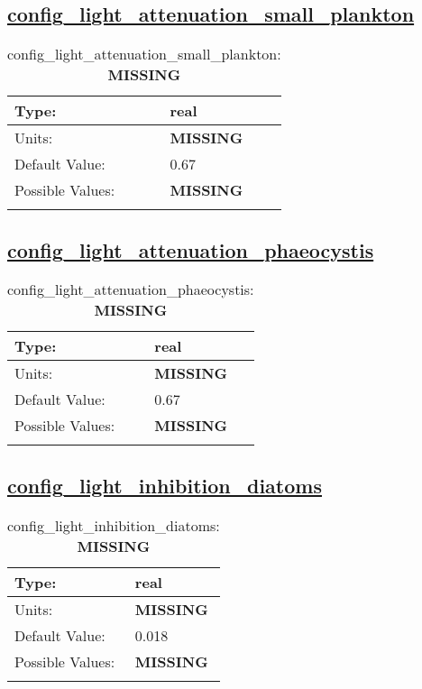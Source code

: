 \subsection[config\_light\_attenuation\_small\_plankton]{\hyperref[sec:nm_tab_biogeochemistry]{config\_light\_attenuation\_small\_plankton}}
\label{subsec:nm_sec_config_light_attenuation_small_plankton}
\begin{center}
\begin{longtable}{| p{2.0in} || p{4.0in} |}
    \hline
    Type: & real \\
    \hline
    Units: & {\bf \color{red} MISSING} \\
    \hline
    Default Value: & 0.67 \\
    \hline
    Possible Values: & {\bf \color{red} MISSING} \\
    \hline
    \caption{config\_light\_attenuation\_small\_plankton: {\bf \color{red} MISSING}}
\end{longtable}
\end{center}
\subsection[config\_light\_attenuation\_phaeocystis]{\hyperref[sec:nm_tab_biogeochemistry]{config\_light\_attenuation\_phaeocystis}}
\label{subsec:nm_sec_config_light_attenuation_phaeocystis}
\begin{center}
\begin{longtable}{| p{2.0in} || p{4.0in} |}
    \hline
    Type: & real \\
    \hline
    Units: & {\bf \color{red} MISSING} \\
    \hline
    Default Value: & 0.67 \\
    \hline
    Possible Values: & {\bf \color{red} MISSING} \\
    \hline
    \caption{config\_light\_attenuation\_phaeocystis: {\bf \color{red} MISSING}}
\end{longtable}
\end{center}
\subsection[config\_light\_inhibition\_diatoms]{\hyperref[sec:nm_tab_biogeochemistry]{config\_light\_inhibition\_diatoms}}
\label{subsec:nm_sec_config_light_inhibition_diatoms}
\begin{center}
\begin{longtable}{| p{2.0in} || p{4.0in} |}
    \hline
    Type: & real \\
    \hline
    Units: & {\bf \color{red} MISSING} \\
    \hline
    Default Value: & 0.018 \\
    \hline
    Possible Values: & {\bf \color{red} MISSING} \\
    \hline
    \caption{config\_light\_inhibition\_diatoms: {\bf \color{red} MISSING}}
\end{longtable}
\end{center}
